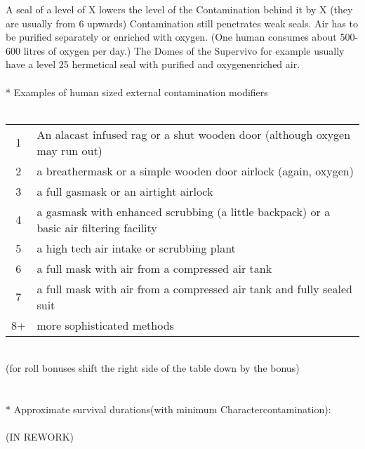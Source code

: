 \documentclass{article}
\begin{document}
    A seal of a level of X lowers the level of the Contamination behind it by X (they are usually from 6 upwards)
    Contamination still penetrates weak seals. Air has to be purified separately or enriched with oxygen.
    (One human consumes about 500-600 litres of oxygen per day.) The Domes of the Supervivo for
    example usually have a level 25 hermetical seal with purified and oxygenenriched air.\\\\*
    Examples of human sized external contamination modifiers\\\\
    \begin{tabular}{cl}
        1& An alacast infused rag or a shut wooden door (although oxygen may run out)\\
        2& a breathermask or a simple wooden door airlock (again, oxygen)\\
        3& a full gasmask  or an airtight airlock\\
        4& a gasmask with enhanced scrubbing (a little backpack) or a basic air filtering facility\\
        5& a high tech air intake or scrubbing plant\\
        6& a full mask with air from a compressed air tank\\
        7& a full mask with air from a compressed air tank and fully sealed suit\\
        8+& more sophisticated methods\\
    \end{tabular}\\(for roll bonuses shift the right side of the table down by the bonus)\\\\\\*
    Approximate survival durations(with minimum Charactercontamination):\\\\
(IN REWORK)
\end{document}
